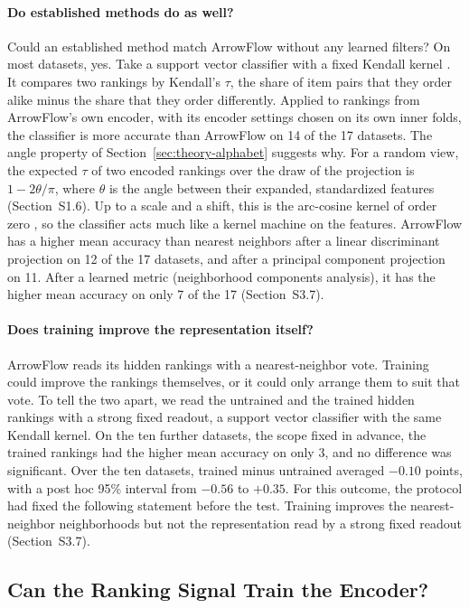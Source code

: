 \paragraph{Do established methods do as well?} Could an established method match ArrowFlow without any learned filters? On most datasets, yes. Take a support vector classifier with a fixed Kendall kernel \citep{jiao2015kernels,jiao2018kendall}. It compares two rankings by Kendall's $\tau$, the share of item pairs that they order alike minus the share that they order differently. Applied to rankings from ArrowFlow's own encoder, with its encoder settings chosen on its own inner folds, the classifier is more accurate than ArrowFlow on 14 of the 17 datasets. The angle property of Section~\ref{sec:theory-alphabet} suggests why. For a random view, the expected $\tau$ of two encoded rankings over the draw of the projection is $1-2\theta/\pi$, where $\theta$ is the angle between their expanded, standardized features (Section~S1.6). Up to a scale and a shift, this is the arc-cosine kernel of order zero \citep{cho2009kernel}, so the classifier acts much like a kernel machine on the features. ArrowFlow has a higher mean accuracy than nearest neighbors after a linear discriminant projection on 12 of the 17 datasets, and after a principal component projection on 11. After a learned metric (neighborhood components analysis), it has the higher mean accuracy on only 7 of the 17 (Section~S3.7).

\paragraph{Does training improve the representation itself?} ArrowFlow reads its hidden rankings with a nearest-neighbor vote. Training could improve the rankings themselves, or it could only arrange them to suit that vote. To tell the two apart, we read the untrained and the trained hidden rankings with a strong fixed readout, a support vector classifier with the same Kendall kernel. On the ten further datasets, the scope fixed in advance, the trained rankings had the higher mean accuracy on only 3, and no difference was significant. Over the ten datasets, trained minus untrained averaged $-0.10$ points, with a post hoc 95\% interval from $-0.56$ to $+0.35$. For this outcome, the protocol had fixed the following statement before the test. Training improves the nearest-neighbor neighborhoods but not the representation read by a strong fixed readout (Section~S3.7).

\subsection{Can the Ranking Signal Train the Encoder?}\label{sec:learned}

